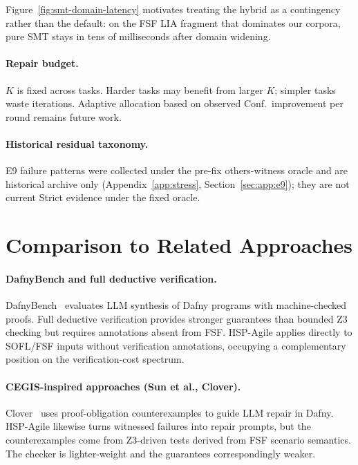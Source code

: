 \noindent
Figure~\ref{fig:smt-domain-latency} motivates treating the hybrid as a
contingency rather than the default: on the FSF LIA fragment that dominates
our corpora, pure SMT stays in tens of milliseconds after domain widening.

\paragraph{Repair budget.}
$K$ is fixed across tasks.
Harder tasks may benefit from larger $K$; simpler tasks waste iterations.
Adaptive allocation based on observed Conf.\ improvement per round remains
future work.

\paragraph{Historical residual taxonomy.}
E9 failure patterns were collected under the pre-fix others-witness oracle
and are historical archive only (Appendix~\ref{app:stress},
Section~\ref{sec:app:e9}); they are not current Strict evidence under the
fixed oracle.


\section{Comparison to Related Approaches}
\label{sec:disc:related}

\paragraph{DafnyBench and full deductive verification.}
DafnyBench~\citep{loughridge2024dafnybench} evaluates LLM synthesis of Dafny
programs with machine-checked proofs.
Full deductive verification provides stronger guarantees than bounded Z3
checking but requires annotations absent from FSF.
HSP-Agile applies directly to SOFL/FSF inputs without verification
annotations, occupying a complementary position on the verification-cost
spectrum.

\paragraph{CEGIS-inspired approaches (Sun et al., Clover).}
Clover~\citep{sun2024clover} uses proof-obligation counterexamples to guide
LLM repair in Dafny.
HSP-Agile likewise turns witnessed failures into repair prompts, but the
counterexamples come from Z3-driven tests derived from FSF scenario semantics.
The checker is lighter-weight and the guarantees correspondingly weaker.

